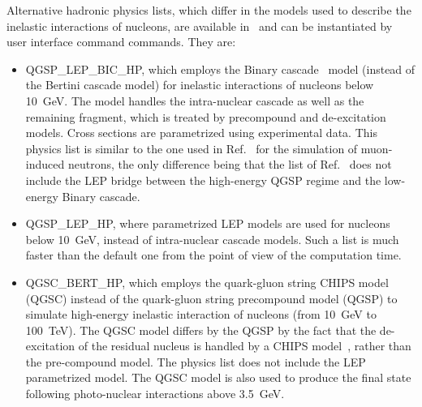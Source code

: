 \documentclass[article]{IEEEtran}
\begin{document}
Alternative hadronic physics lists, which differ in the models used to describe the 
inelastic interactions of nucleons, are available in \MaGe\ and can be instantiated by 
user interface command commands. They are: 
\begin{itemize}
\item QGSP\_LEP\_BIC\_HP, which employs the Binary cascade~\cite{physics-manual} model  
(instead of the Bertini cascade model) for inelastic interactions of nucleons below 
10~GeV. The model handles the intra-nuclear cascade as well as the remaining 
fragment, which is treated by precompound and de-excitation models. Cross sections are 
parametrized using experimental data. This physics list is similar to the one used in 
Ref.~\cite{Lindote:09} for the simulation of muon-induced neutrons, the only difference 
being that the list of Ref.~\cite{Lindote:09} does not include the LEP bridge between 
the high-energy QGSP regime and the low-energy Binary cascade.
\item QGSP\_LEP\_HP, where parametrized LEP models are used for nucleons below 10~GeV, instead 
of intra-nuclear cascade models. Such a list is much faster than the default one from 
the point of view of the computation time.
\item QGSC\_BERT\_HP, which employs the quark-gluon string CHIPS model (QGSC) instead of 
the quark-gluon string precompound model (QGSP) to simulate high-energy inelastic 
interaction of nucleons (from 10~GeV to 100~TeV). The QGSC model differs by the QGSP 
by the fact that the de-excitation of the residual nucleus is handled by a CHIPS 
model~\cite{chips3,chips1,chips2}, 
rather than the pre-compound model. The physics list does not include 
the LEP parametrized model. The QGSC model is also used to produce the final state 
following photo-nuclear interactions above 3.5~GeV.
\end{itemize}
\end{document}
